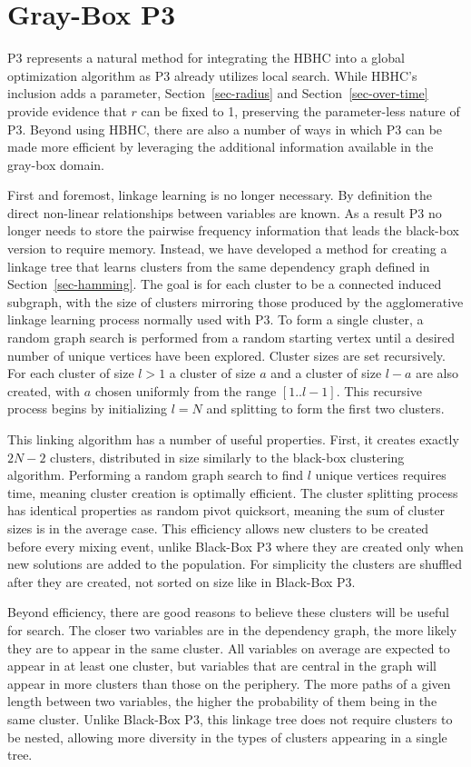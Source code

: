 \chapter{Gray-Box P3}
P3 represents a natural method for integrating the HBHC into
a global optimization algorithm as P3 already utilizes local search.
While HBHC's inclusion adds a parameter, Section~\ref{sec-radius} and
Section~\ref{sec-over-time} provide evidence that $r$ can be fixed to 1, preserving
the parameter-less nature of P3.
Beyond using HBHC, there
are also a number of ways in which P3 can be made more efficient by leveraging the
additional information available in the gray-box domain.

First and foremost, linkage learning is no longer necessary. By definition
the direct non-linear relationships between variables are known. As a result
P3 no longer needs to store the pairwise frequency information that leads
the black-box version to require  memory. Instead,
we have developed a method for creating a linkage tree that learns clusters
from the same dependency graph defined in Section~\ref{sec-hamming}. The goal is for each
cluster to be a connected induced subgraph, with the size of clusters
mirroring those produced by the agglomerative linkage learning process normally
used with P3. To form a single cluster, a random graph search is performed from
a random starting vertex until a desired number of unique vertices have been explored.
Cluster sizes are set recursively. For each cluster of size $l>1$
a cluster of size $a$ and a cluster of size $l-a$ are also created, with $a$ chosen uniformly
from the range $[1..l-1]$. This recursive process begins by initializing $l=N$ and splitting
to form the first two clusters.

This linking algorithm has a number of useful properties. First, it creates exactly
$2N-2$ clusters, distributed in size similarly to the black-box clustering algorithm.
Performing a random graph search to find $l$ unique vertices requires  time,
meaning cluster creation is optimally efficient.
The cluster splitting process has identical properties as random pivot quicksort,
meaning the sum of cluster sizes is  in the average case.
This efficiency allows new clusters to be created before every mixing event,
unlike Black-Box P3 where they are created only when new solutions are added to the population.
For simplicity the clusters are shuffled after they are created, not sorted on size like in
Black-Box P3.

Beyond efficiency, there are good reasons to believe these clusters will be useful
for search. The closer two variables are in the dependency graph, the more likely
they are to appear in the same cluster. All variables on average are expected to appear
in at least one cluster, but variables that are central in the graph will appear in more
clusters than those on the periphery. The more paths of a given
length between two variables, the higher the probability of them being in the same cluster.
Unlike Black-Box P3, this linkage tree does not require clusters to be nested, allowing
more diversity in the types of clusters appearing in a single tree.

